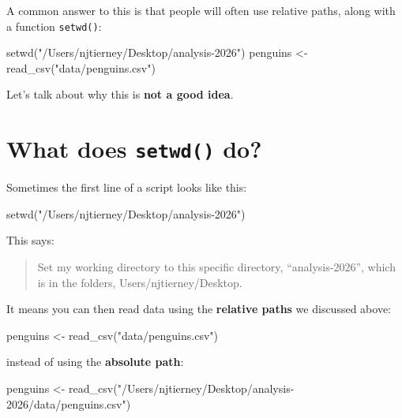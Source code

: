\documentclass[
  letterpaper,
  justified,
  a4paper]{tufte-book}
\makeatletter
\newenvironment{Shaded}{\begin{snugshade}}{\end{snugshade}}
\newcommand{\FunctionTok}[1]{\textcolor[rgb]{0.28,0.35,0.67}{#1}}
\newcommand{\NormalTok}[1]{\textcolor[rgb]{0.00,0.23,0.31}{#1}}
\newcommand{\OtherTok}[1]{\textcolor[rgb]{0.00,0.23,0.31}{#1}}
\newcommand{\StringTok}[1]{\textcolor[rgb]{0.13,0.47,0.30}{#1}}
\let\rbporigShaded\Shaded
\let\rbporigendShaded\endShaded
\renewenvironment{Shaded}{%
  \begingroup
  \ifdim\linewidth=\rbpbodywidth
    \advance\linewidth by \@tufte@overhang
    \advance\hsize by \@tufte@overhang
    \advance\columnwidth by \@tufte@overhang
  \fi
  \rbporigShaded
}{%
  \rbporigendShaded
  \endgroup
}
\makeatother
\begin{document}
A common answer to this is that people will often use relative paths,
along with a function \texttt{setwd()}:

\begin{Shaded}
\begin{Highlighting}[]
\FunctionTok{setwd}\NormalTok{(}\StringTok{"/Users/njtierney/Desktop/analysis{-}2026"}\NormalTok{)}
\NormalTok{penguins }\OtherTok{\textless{}{-}} \FunctionTok{read\_csv}\NormalTok{(}\StringTok{"data/penguins.csv"}\NormalTok{)}
\end{Highlighting}
\end{Shaded}

Let's talk about why this is \textbf{not a good idea}.

\section{\texorpdfstring{What does \texttt{setwd()}
do?}{What does setwd() do?}}\label{what-does-setwd-do}

Sometimes the first line of a script looks like this:

\begin{Shaded}
\begin{Highlighting}[]
\FunctionTok{setwd}\NormalTok{(}\StringTok{"/Users/njtierney/Desktop/analysis{-}2026"}\NormalTok{)}
\end{Highlighting}
\end{Shaded}

This says:

\begin{quote}
Set my working directory to this specific directory, ``analysis-2026'',
which is in the folders, Users/njtierney/Desktop.
\end{quote}

It means you can then read data using the \textbf{relative paths} we
discussed above:

\begin{Shaded}
\begin{Highlighting}[]
\NormalTok{penguins }\OtherTok{\textless{}{-}} \FunctionTok{read\_csv}\NormalTok{(}\StringTok{"data/penguins.csv"}\NormalTok{)}
\end{Highlighting}
\end{Shaded}

instead of using the \textbf{absolute path}:

\begin{Shaded}
\begin{Highlighting}[]
\NormalTok{penguins }\OtherTok{\textless{}{-}} \FunctionTok{read\_csv}\NormalTok{(}\StringTok{"/Users/njtierney/Desktop/analysis{-}2026/data/penguins.csv"}\NormalTok{)}
\end{Highlighting}
\end{Shaded}
\end{document}
